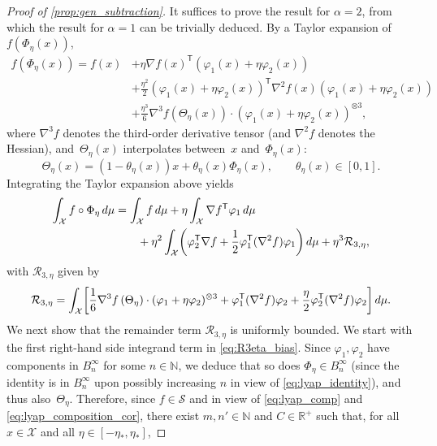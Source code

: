 \documentclass[11pt]{article}
\newcommand{\R}{\mathbb{R}}
\newcommand{\N}{\mathbb{N}}
\renewcommand{\S}{\mathscr{S}}
\renewcommand{\t}{\mathsf T}
\DeclarePairedDelimiter\paren{\lparen}{\rparen}
\DeclarePairedDelimiter\bkt{\lbrack}{\rbrack}
\theoremstyle{definition}
\begin{document}
\begin{proof}[Proof of \cref{prop:gen_subtraction}]
It suffices to prove the result for $\alpha=2$, from which the result for $\alpha=1$ can be trivially deduced. By a Taylor expansion of $f(\Phi_\eta(x))$,
\begin{align}
		f(\Phi_\eta(x)) = f(x) &+ \eta \nabla f(x)^\t(\varphi_1(x) + \eta\varphi_2(x)) \\
		&+ \frac{\eta^2}{2}(\varphi_1(x) + \eta\varphi_2(x))^\t \nabla^2 f(x)(\varphi_1(x) + \eta\varphi_2(x)) \\
		&+ \frac{\eta^3}{6} \nabla^3f\left(\Theta_\eta(x)\right)\cdot (\varphi_1(x) + \eta\varphi_2(x))^{\otimes 3},
\end{align}
where $\nabla^3 f$ denotes the third-order derivative tensor (and $\nabla^2 f$ denotes the Hessian), and~$\Theta_\eta(x)$ interpolates between~$x$ and~$\Phi_\eta(x)$:
\begin{equation}
	\Theta_\eta(x) = (1-\theta_\eta(x))x + \theta_\eta(x)\Phi_\eta(x), \qquad \theta_\eta(x) \in [0,1].
\end{equation}
Integrating the Taylor expansion above yields
\begin{equation}
\label{eq:prop_rhs_terms}
\begin{split}
	\int_\mathcal{X} f\circ\Phi_\eta \, d\mu &= \int_\mathcal{X} f \, d\mu + \eta \int_\mathcal{X}\nabla f^\t \varphi_1 \, d\mu \\
 &\qquad + \eta^2\int_\mathcal{X} \paren*{\varphi_2^\t \nabla f+\frac{1}{2}\varphi_1^\t(\nabla^2 f)\varphi_1} \, d\mu + \eta^3\mathcal{R}_{3,\eta},
 \end{split}
\end{equation}
with $\mathcal{R}_{3,\eta}$ given by \begin{equation}
\mathcal{R}_{3,\eta} = \int_\mathcal{X} \bkt*{\frac{1}{6}\nabla^3f\left(\Theta_\eta\right)\cdot (\varphi_1 + \eta\varphi_2)^{\otimes 3} + \varphi_1^\t (\nabla^2 f)\varphi_2 + \frac{\eta}{2}\varphi_2^\t (\nabla^2 f)\varphi_2} \, d\mu.
	\label{eq:R3eta_bias}
\end{equation}
We next show that the remainder term $\mathcal{R}_{3,\eta}$ is uniformly bounded. We start with the first right-hand side integrand term in \eqref{eq:R3eta_bias}. Since $\varphi_1,\varphi_2$ have components in $B^\infty_n$ for some $n\in\N$, we deduce that so does $\Phi_\eta\in B^\infty_n$ (since the identity is in $B^\infty_n$ upon possibly increasing $n$ in view of \eqref{eq:lyap_identity}), and thus also~$\Theta_\eta$. Therefore, since $f\in\S$ and in view of \eqref{eq:lyap_comp} and \eqref{eq:lyap_composition_cor}, there exist $m,n'\in\N$ and $C\in\R^+$ such that, for all~$x\in\mathcal{X}$ and all $\eta\in [-\eta_*,\eta_*]$,

\end{proof}
\end{document}
